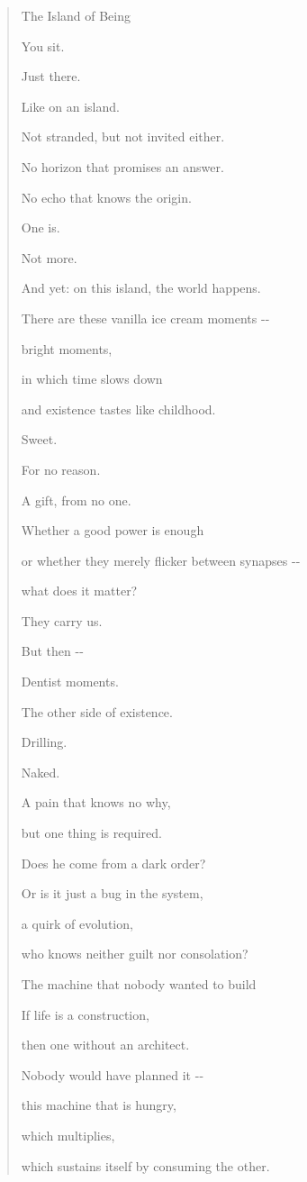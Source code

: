 \documentclass[
  ngerman,
]{article}
\begin{document}
\begin{quote}
The Island of Being

You sit.

Just there.

Like on an island.

Not stranded, but not invited either.

No horizon that promises an answer.

No echo that knows the origin.

One is.

Not more.

And yet: on this island, the world happens.

There are these vanilla ice cream moments -\/-

bright moments,

in which time slows down

and existence tastes like childhood.

Sweet.

For no reason.

A gift, from no one.

Whether a good power is enough

or whether they merely flicker between synapses -\/-

what does it matter?

They carry us.

But then -\/-

Dentist moments.

The other side of existence.

Drilling.

Naked.

A pain that knows no why,

but one thing is required.

Does he come from a dark order?

Or is it just a bug in the system,

a quirk of evolution,

who knows neither guilt nor consolation?

The machine that nobody wanted to build

If life is a construction,

then one without an architect.

Nobody would have planned it -\/-

this machine that is hungry,

which multiplies,

which sustains itself by consuming the other.


\end{quote}
\end{document}
